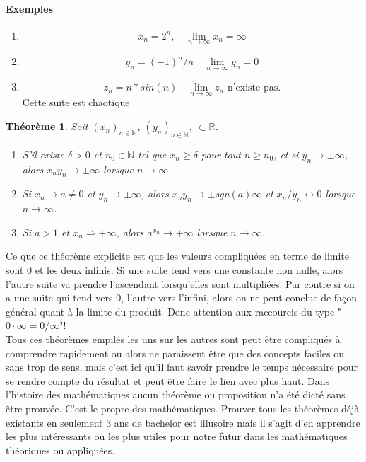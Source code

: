 \documentclass[a4paper, 12pt, french, twoside]{article}
\newtheorem{theorem}{Théorème}[section]
\newcommand{\Nn}{{\mathbb{N}}}
\newcommand{\Rr}{{\mathbb{R}}}
\begin{document}
\paragraph{Exemples}
\begin{enumerate}
    \item \[x_n=2^n, \quad \lim_{n\rightarrow\infty}x_n=\infty\]
    \item \[y_n=(-1)^n/n \quad \lim_{n\rightarrow\infty}y_n=0\]
    \item \[z_n=n*sin(n) \quad \lim_{n\rightarrow\infty}z_n \text{ n'existe pas.}\]  Cette suite est chaotique
    
\end{enumerate}
\begin{theorem}
    Soit $(x_n)_{n\in\Nn}$, $(y_n)_{n\in\Nn}$,  $\subset \Rr$.
\begin{enumerate}
    \item S'il existe $\delta >0$ et $n_0\in\Nn$ tel que $x_n\geq \delta$ pour tout $n\geq n_0$, et si $y_n\longrightarrow\pm \infty$, alors $x_ny_n\longrightarrow\pm\infty$ lorsque $n\longrightarrow\infty$
    \item Si $x_n\longrightarrow a\neq 0$ et $y_n\longrightarrow \pm \infty$, alors $x_ny_n\longrightarrow\pm$sgn$(a)\infty$ et $x_n/y_n\longleftrightarrow 0$ lorsque $n\rightarrow\infty$.
    \item Si $a>1$ et $x_n\Longrightarrow + \infty$, alors $a^{x_n}\rightarrow +\infty $ lorsque $n\rightarrow\infty$. 
\end{enumerate}
\end{theorem}
Ce que ce théorème explicite est que les valeurs compliquées en terme de limite sont 0 et les deux infinis. Si une suite tend vers une constante non nulle, alors l'autre suite va prendre l'ascendant lorsqu'elles sont multipliées. Par contre si on a une suite qui tend vers 0, l'autre vers l'infini, alors on ne peut conclue de façon général quant à la limite du produit. Donc attention aux raccourcis du type "$0\cdot \infty=0/\infty$"!\\


Tous ces théorèmes empilés les uns sur les autres sont peut être compliqués à comprendre rapidement ou alors ne paraissent être que des concepts faciles ou sans trop de sens, mais c'est ici qu'il faut savoir prendre le temps nécessaire pour se rendre compte du résultat et peut être faire le lien avec plus haut. Dans l'histoire des mathématiques aucun théorème ou proposition n'a été dicté sans être prouvée. C'est le propre des mathématiques. Prouver tous les théorèmes déjà existants en seulement 3 ans de bachelor est illusoire mais il s'agit d'en apprendre les plus intéressants ou les plus utiles pour notre futur dans les mathématiques théoriques ou appliquées. \\
\end{document}
